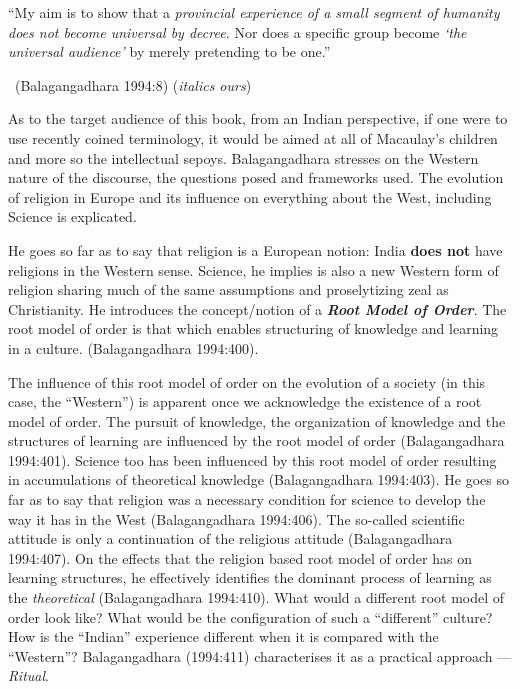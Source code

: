 \begin{myquote}
“My aim is to show that a \textit{provincial experience of a small segment of humanity does not become universal by decree.} Nor does a specific group become \textit{‘the universal audience'} by merely pretending to be one.” 

~\hfill (Balagangadhara 1994:8) (\textit{italics ours})
\end{myquote}

As to the target audience of this book, from an Indian perspective, if one were to use recently coined terminology, it would be aimed at all of Macaulay's children and more so the intellectual sepoys. Balagangadhara stresses on the Western nature of the discourse, the questions posed and frameworks used. The evolution of religion in Europe and its influence on everything about the West, including Science is explicated.

He goes so far as to say that religion is a European notion: India \textbf{does not} have religions in the Western sense. Science, he implies is also a new Western form of religion sharing much of the same assumptions and proselytizing zeal as Christianity. He introduces the concept/notion of a \textbf{\textit{Root Model of Order}}. The root model of order is that which enables structuring of knowledge and learning in a culture. (Balagangadhara 1994:400).

The influence of this root model of order on the evolution of a society (in this case, the “Western”) is apparent once we acknowledge the existence of a root model of order. The pursuit of knowledge, the organization of knowledge and the structures of learning are influenced by the root model of order (Balagangadhara 1994:401). Science too has been influenced by this root model of order resulting in accumulations of theoretical knowledge (Balagangadhara 1994:403). He goes so far as to say that religion was a necessary condition for science to develop the way it has in the West (Balagangadhara 1994:406). The so-called scientific attitude is only a continuation of the religious attitude (Balagangadhara 1994:407). On the effects that the religion based root model of order has on learning structures, he effectively identifies the dominant process of learning as the \textit{theoretical} (Balagangadhara 1994:410). What would a different root model of order look like? What would be the configuration of such a “different” culture? How is the “Indian” experience different when it is compared with the “Western”? Balagangadhara (1994:411) characterises it as a practical approach — \textit{Ritual}.


